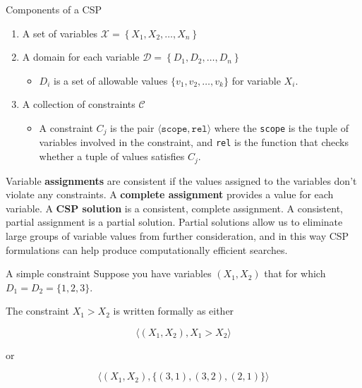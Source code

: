 \documentclass{beamer}
\author{Chapter 6: Constraint Satisfaction Problems}
\title{}
\subtitle{}
\date{}
\begin{document}
\begin{frame}
  \titlepage
\end{frame}

\begin{frame}{Components of a CSP}

    \begin{enumerate}
        \item A set of variables $\mathcal{X} = \left\{ X_1, X_2, \dots, X_n\right\}$
        \item A domain for each variable $\mathcal{D} = \left\{ D_1, D_2, \dots, D_n\right\}$
        \begin{itemize}
            \item $D_i$ is a set of allowable values $\{v_1, v_2, \dots, v_k\}$ for 
            variable $X_i$.
        \end{itemize}
        \item A collection of constraints $\mathcal{C}$
        \begin{itemize}
            \item A constraint $C_j$ is the pair 
            $\langle \texttt{scope}, \texttt{rel} \rangle$
            where the \texttt{scope} is the tuple of variables involved in the constraint, 
            and \texttt{rel} is the function that checks whether a tuple of values satisfies $C_j$.
        \end{itemize}
    \end{enumerate}

    \small
    Variable {\bf assignments} are consistent if the values assigned to the 
    variables don't violate any constraints. A {\bf complete assignment} provides
    a value for each variable. A {\bf CSP solution} is a consistent, complete assignment. A consistent, partial assignment is a partial solution. Partial solutions allow us to eliminate large groups of variable values from further 
    consideration, and in this way CSP formulations can help produce computationally
    efficient searches.
    
\end{frame}

\begin{frame}{A simple constraint}
    Suppose you have variables $(X_1, X_2)$ that for which
    $D_1 = D_2 = \{1, 2, 3\}$.

    \vspace{.1in}

    The constraint $X_1>X_2$ is written formally as either

    \[\langle (X_1, X_2), X_1 > X_2 \rangle\]

    or 

    
    \[\langle (X_1, X_2), \{(3,1), (3,2), (2,1)\} \rangle\]

    
\end{frame}
\end{document}
